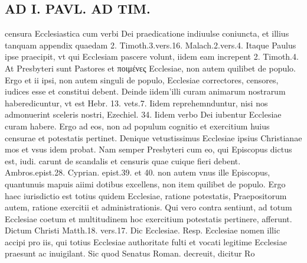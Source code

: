 \documentclass{article}
\begin{document}
\begin{pages}
\section*{AD I. PAVL. AD TIM. }
\marginpar{[ p.446 ]}\pstart censura Ecclesiastica cum verbi Dei praedicatione indiuulse coniuncta, et illius tanquam appendix quaedam 2. Timoth.3.vers.16. Malach.2.vers.4. Itaque Paulus ipse praecipit, vt qui Ecclesiam pascere volunt, iidem eam increpent 2. Timoth.4. At Presbyteri sunt Pastores et ποιμένες Ecclesiae, non autem quilibet de populo. Ergo et ii ipsi, non autem singuli de populo, Ecclesiae correctores, censores, iudices esse et constitui debent. Deinde iidem’illi curam animarum nostrarum haberedicuntur, vt est Hebr. 13. vets.7. Iidem reprehemnduntur, nisi nos admonuerint sceleris nostri, Ezechiel. 34. Iidem verbo Dei iubentur Ecclesiae curam habere. Ergo ad eos, non ad populum cognitio et exercitium huius censurae et potestatis pertinet. Denique  vetustissimus Ecclesiae ipsius Christianae mos et vsus idem probat. Nam semper Presbyteri cum eo, qui Episcopus dictus est, iudi. carunt de scandalis et censuris quae cuique fieri debent. Ambros.epist.28. Cyprian. epist.39. et 40. non autem vnus ille Episcopus, quantunuis mapuis aiimi dotibus excellens, non item quilibet de populo. Ergo haec iurisdictio est totius quidem Ecclesiae, ratione potestatis, Praepositorum autem, ratione exercitii et administrationis.  \pend\pstart Qui vero contra sentiunt, ad totum Ecclesiae coetum et multitudinem hoc exercitium potestatis pertinere, afferunt.  \pend{} Dictum Christi Matth.18. vers.17. Dic Ecclesiae. Resp. Ecclesiae nomen illic accipi pro iis, qui totius Ecclesiae authoritate fulti et vocati legitime Ecclesiae praesunt ac inuigilant. Sic quod Senatus Roman. decreuit, dicitur Ro\pend

\end{pages}
\end{document}
